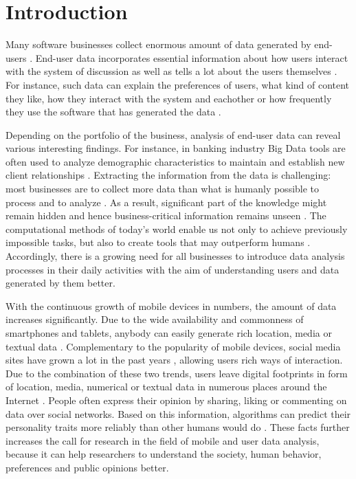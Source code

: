 \documentclass[conference]{IEEEtran}
\begin{document}
\section{Introduction}
Many software businesses collect enormous amount of data generated by end-users \cite{chinesemobilebankingusers, bigdatamanagementrevolution, inmon2007tapping}. End-user data incorporates essential information about how users interact with the system of discussion as well as tells a lot about the users themselves \cite{jang2015noreciprocity, hu2014we, jang2016teensengagemorewithfewerphotos, han2016teensarefrommars, socialdiversityongithub}. For instance, such data can explain the preferences of users, what kind of content they like, how they interact with the system and eachother or how frequently they use the software that has generated the data \cite{youyou2015computer, ottoni2013ladies}.

 Depending on the portfolio of the business, analysis of end-user data can reveal various interesting findings. For instance, in banking industry Big Data tools are often used to analyze demographic characteristics to maintain and establish new client relationships \cite{chinesemobilebankingusers, bigdatamanagementrevolution}. Extracting the information from the data is challenging: most businesses are to collect more data than what is humanly possible to process and to analyze \cite{inmon2007tapping, wegener2010integrating}. As a result, significant part of the knowledge might remain hidden and hence business-critical information remains unseen \cite{inmon2007tapping, wegener2010integrating, introtodatamining, chinesemobilebankingusers}. The computational methods of today's world enable us not only to achieve previously impossible tasks, but also to create tools that may outperform humans \cite{youyou2015computer}. Accordingly, there is a growing need for all businesses to introduce data analysis processes in their daily activities with the aim of understanding users and data generated by them better.

 With the continuous growth of mobile devices in numbers, the amount of data increases significantly. Due to the wide availability and commonness of smartphones and tablets, anybody can easily generate rich location, media or textual data \cite{jang2016teensengagemorewithfewerphotos}. Complementary to the popularity of mobile devices, social media sites have grown a lot in the past years \cite{ottoni2013ladies, hu2014we, bakhshi2014faces}, allowing users rich ways of interaction. Due to the combination of these two trends, users leave digital footprints in form of location, media, numerical or textual data in numerous places around the Internet \cite{youyou2015computer}. People often express their opinion by sharing, liking or commenting on data over social networks. Based on this information, algorithms can predict their personality traits more reliably than other humans would do \cite{youyou2015computer}. These facts further increases the call for research in the field of mobile and user data analysis, because it can help researchers to understand the society, human behavior, preferences and public opinions better.
\end{document}
